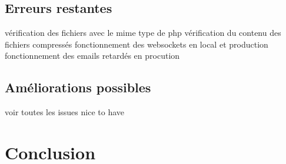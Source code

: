 \documentclass[
    iai, %
    il, %
]{heig-tb}
\begin{document}
\section{Erreurs restantes}

vérification des fichiers avec le mime type de php
vérification du contenu des fichiers compressés
fonctionnement des websockets en local et production
fonctionnement des emails retardés en procution

\section{Améliorations possibles}
voir toutes les issues nice to have





\chapter{Conclusion}

\end{document}
